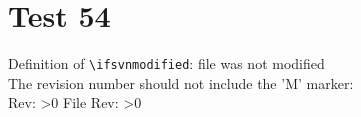 \documentclass[12pt]{report}
\begin{document}
\chapter{Test 54}
Definition of \verb+\ifsvnmodified+: file was not modified\\

\noindent
The revision number should not include the 'M' marker:\\
Rev: \ifnum\svnrev>0 \fi
File Rev: \ifnum\svnfilerev>0 \fi

\end{document}
